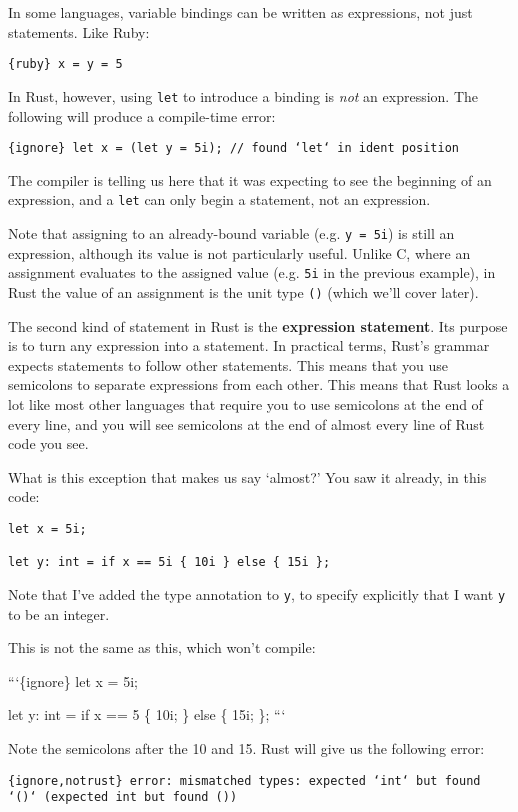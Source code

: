 \documentclass[]{article}
\begin{document}
In some languages, variable bindings can be written as expressions, not
just statements. Like Ruby:

\texttt{\{ruby\} x = y = 5}

In Rust, however, using \texttt{let} to introduce a binding is
\emph{not} an expression. The following will produce a compile-time
error:

\texttt{\{ignore\} let x = (let y = 5i); // found `let` in ident position}

The compiler is telling us here that it was expecting to see the
beginning of an expression, and a \texttt{let} can only begin a
statement, not an expression.

Note that assigning to an already-bound variable (e.g. \texttt{y = 5i})
is still an expression, although its value is not particularly useful.
Unlike C, where an assignment evaluates to the assigned value (e.g.
\texttt{5i} in the previous example), in Rust the value of an assignment
is the unit type \texttt{()} (which we'll cover later).

The second kind of statement in Rust is the \textbf{expression
statement}. Its purpose is to turn any expression into a statement. In
practical terms, Rust's grammar expects statements to follow other
statements. This means that you use semicolons to separate expressions
from each other. This means that Rust looks a lot like most other
languages that require you to use semicolons at the end of every line,
and you will see semicolons at the end of almost every line of Rust code
you see.

What is this exception that makes us say `almost?' You saw it already,
in this code:

\begin{verbatim}
let x = 5i;

let y: int = if x == 5i { 10i } else { 15i };
\end{verbatim}

Note that I've added the type annotation to \texttt{y}, to specify
explicitly that I want \texttt{y} to be an integer.

This is not the same as this, which won't compile:

```\{ignore\} let x = 5i;

let y: int = if x == 5 \{ 10i; \} else \{ 15i; \}; ```

Note the semicolons after the 10 and 15. Rust will give us the following
error:

\texttt{\{ignore,notrust\} error: mismatched types: expected `int` but found `()` (expected int but found ())}
\end{document}
